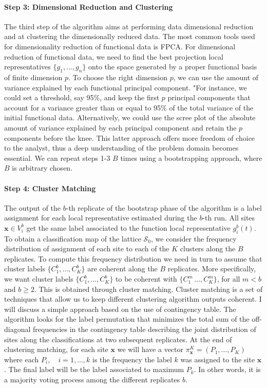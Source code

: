 \paragraph{Step 3: Dimensional Reduction and Clustering} The third step of the algorithm aims at performing data dimensional reduction and at clustering the dimensionally reduced data. The most common tools used for dimensionality reduction of functional data is FPCA. For dimensional reduction of functional data, we need to find the best projection local representatives $\{g_1, \dots, g_n \}$ onto the space generated by a proper functional basis of finite dimension $p$. To choose the right dimension $p$, we can use the amount of variance explained by each functional principal component. "For instance, we could set a threshold, say 95\%, and keep the first $p$ principal components that account for a variance greater than or equal to 95\% of the total variance of the initial functional data. Alternatively, we could use the scree plot of the absolute amount of variance explained by each principal component and retain the $p$ components before the knee. This latter approach offers more freedom of choice to the analyst, thus a deep understanding of the problem domain becomes essential. We can repeat steps 1-3 $B$ times using a bootstrapping approach, where $B$ is arbitrary chosen. 

\paragraph{Step 4: Cluster Matching} The output of the $b$-th replicate of the bootstrap phase of the algorithm is a label assignment for each local representative estimated during the $b$-th run. All sites $\mathbf{x} \in V_i^b$ get the same label associated to the function local representative $g_i^b(t)$. To obtain a classification map of the lattice $\mathcal{S}_0$, we consider the frequency distribution of assignment of each site to each of the $K$ clusters along the $B$ replicates. To compute this frequency distribution we need in turn to assume that cluster labels $\{C_1^b, \dots, C_K^b\}$ are coherent along the $B$ replicates. More specifically, we want cluster labels $\{C_1^b, \dots, C_K^b\}$ to be coherent with $\{C_1^m\, \dots, C_K^m\}$, for all $m<b$ and $b\geq2$. This is obtained through cluster matching. Cluster matching is a set of techniques that allow us to keep different clustering algorithm outputs coherent. I will discuss a simple approach based on the use of contingency table. The algorithm looks for the label permutation that minimizes the total sum of the off-diagonal frequencies in the contingency table describing the joint distribution of sites along the classifications at two subsequent replicates. At the end of clustering matching, for each site $\mathbf{x}$ we will have a vector $\pi_{\mathbf{x}}^K=\left(P_1, \dots, P_K\right)$ where each $P_i, \quad i=1,\dots,k$ is the frequency the label $k$ was assigned to the site $\mathbf{x}$. The final label will be the label associated to maximum $P_k$. In other words, it is a majority voting process among the different replicates $b$.

